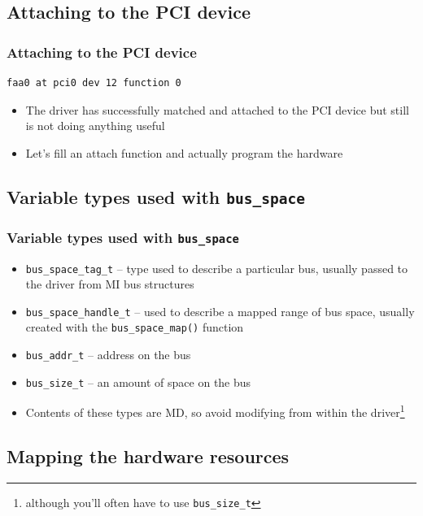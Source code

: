 \documentclass[dvipsnames,table]{beamer}
\begin{document}
\subsection{Attaching to the PCI device}

\begin{frame}[fragile]
\frametitle{Attaching to the PCI device}
\begin{verbatim}
faa0 at pci0 dev 12 function 0
\end{verbatim}
\begin{itemize}
	\item The driver has successfully matched and attached to the PCI device but still is not doing anything useful
	\item Let's fill an attach function and actually program the hardware
\end{itemize}
\end{frame}

\subsection{Variable types used with {\tt bus\_space}}

\begin{frame}
\frametitle{Variable types used with {\tt bus\_space}}

\begin{itemize}
         \item {\tt bus\_space\_tag\_t} -- type used to describe a particular bus, usually passed to the driver from MI bus structures
         \item {\tt bus\_space\_handle\_t} --  used to describe a mapped range of bus space, usually created with the {\tt bus\_space\_map()} function
         \item {\tt bus\_addr\_t} -- address on the bus
         \item {\tt bus\_size\_t} -- an amount of space on the bus
         \item Contents of these types are MD, so avoid modifying from within the driver\footnote{although you'll often have to use {\tt bus\_size\_t}}
\end{itemize}
\end{frame}


\subsection{Mapping the hardware resources}
\end{document}
